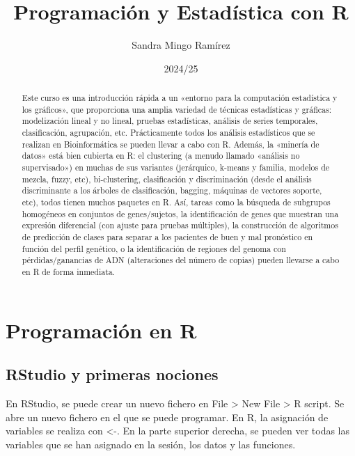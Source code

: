 \documentclass{config/apuntes}\usepackage[]{graphicx}\usepackage[]{xcolor}
\title{Programación y Estadística con R}
\author{Sandra Mingo Ramírez}
\date{2024/25}
\begin{document}
\begin{abstract}
Este curso es una introducción rápida a un «entorno para la computación estadística y los gráficos», que proporciona una amplia variedad de técnicas estadísticas y gráficas: modelización lineal y no lineal, pruebas estadísticas, análisis de series temporales, clasificación, agrupación, etc. Prácticamente todos los análisis estadísticos que se realizan en Bioinformática se pueden llevar a cabo con R. Además, la «minería de datos» está bien cubierta en R: el clustering (a menudo llamado «análisis no supervisado») en muchas de sus variantes (jerárquico, k-means y familia, modelos de mezcla, fuzzy, etc), bi-clustering, clasificación y discriminación (desde el análisis discriminante a los árboles de clasificación, bagging, máquinas de vectores soporte, etc), todos tienen muchos paquetes en R. Así, tareas como la búsqueda de subgrupos homogéneos en conjuntos de genes/sujetos, la identificación de genes que muestran una expresión diferencial (con ajuste para pruebas múltiples), la construcción de algoritmos de predicción de clases para separar a los pacientes de buen y mal pronóstico en función del perfil genético, o la identificación de regiones del genoma con pérdidas/ganancias de ADN (alteraciones del número de copias) pueden llevarse a cabo en R de forma inmediata.
\end{abstract}

\pagestyle{plain}

\maketitle

\tableofcontents




\part{Programación en R}
\chapter{RStudio y primeras nociones}
En RStudio, se puede crear un nuevo fichero en File > New File > R script. Se abre un nuevo fichero en el que se puede programar. En R, la asignación de variables se realiza con <-. En la parte superior derecha, se pueden ver todas las variables que se han asignado en la sesión, los datos y las funciones.
\end{document}
